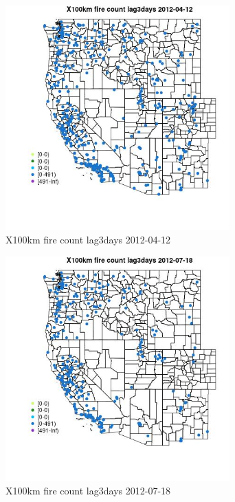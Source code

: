 \begin{figure} 
\centering  
\includegraphics[width=0.77\textwidth]{Code_Outputs/Report_ML_input_PM25_Step4_part_e_de_duplicated_aves_compiled_2019-05-14wNAs_MapObsX100km_fire_count_lag3days2012-04-12.jpg} 
\caption{\label{fig:Report_ML_input_PM25_Step4_part_e_de_duplicated_aves_compiled_2019-05-14wNAsMapObsX100km_fire_count_lag3days2012-04-12}X100km fire count lag3days 2012-04-12} 
\end{figure} 
 

\begin{figure} 
\centering  
\includegraphics[width=0.77\textwidth]{Code_Outputs/Report_ML_input_PM25_Step4_part_e_de_duplicated_aves_compiled_2019-05-14wNAs_MapObsX100km_fire_count_lag3days2012-07-18.jpg} 
\caption{\label{fig:Report_ML_input_PM25_Step4_part_e_de_duplicated_aves_compiled_2019-05-14wNAsMapObsX100km_fire_count_lag3days2012-07-18}X100km fire count lag3days 2012-07-18} 
\end{figure} 
 

